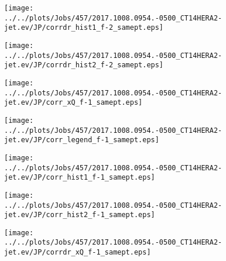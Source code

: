 \documentclass[12pt]{article}
\begin{document}
\begin{figure}
\texttt{[image: ../../plots/Jobs/457/2017.1008.0954.-0500\_CT14HERA2-jet.ev/JP/corrdr\_hist1\_f-2\_samept.eps]}
\caption{}
\end{figure}\newpage\clearpage
\begin{figure}
\texttt{[image: ../../plots/Jobs/457/2017.1008.0954.-0500\_CT14HERA2-jet.ev/JP/corrdr\_hist2\_f-2\_samept.eps]}
\caption{}
\end{figure}\newpage\clearpage
\begin{figure}
\texttt{[image: ../../plots/Jobs/457/2017.1008.0954.-0500\_CT14HERA2-jet.ev/JP/corr\_xQ\_f-1\_samept.eps]}
\caption{}
\end{figure}\newpage\clearpage
\begin{figure}
\texttt{[image: ../../plots/Jobs/457/2017.1008.0954.-0500\_CT14HERA2-jet.ev/JP/corr\_legend\_f-1\_samept.eps]}
\caption{}
\end{figure}\newpage\clearpage
\begin{figure}
\texttt{[image: ../../plots/Jobs/457/2017.1008.0954.-0500\_CT14HERA2-jet.ev/JP/corr\_hist1\_f-1\_samept.eps]}
\caption{}
\end{figure}\newpage\clearpage
\begin{figure}
\texttt{[image: ../../plots/Jobs/457/2017.1008.0954.-0500\_CT14HERA2-jet.ev/JP/corr\_hist2\_f-1\_samept.eps]}
\caption{}
\end{figure}\newpage\clearpage
\begin{figure}
\texttt{[image: ../../plots/Jobs/457/2017.1008.0954.-0500\_CT14HERA2-jet.ev/JP/corrdr\_xQ\_f-1\_samept.eps]}
\caption{}
\end{figure}\newpage\clearpage
\end{document}
